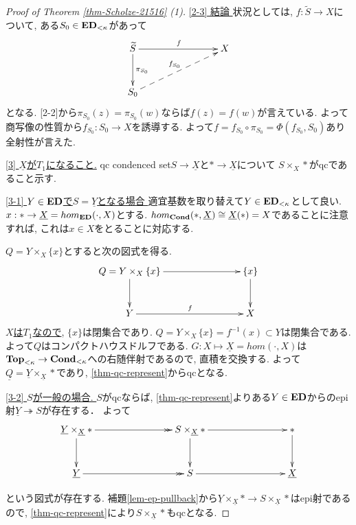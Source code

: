 \documentclass[dvipdfmx,a4paper,11pt]{report}
\theoremstyle{definition}
\begin{document}
\begin{proof}[Proof of Theorem \ref{thm-Scholze-21516} (1)]
\underline{[2-3] 結論 }
状況としては, $f : \widetilde{S} \to X$について, ある$S_0 \in {\bf ED}_{< \kappa}$があって
\begin{equation*}
\xymatrix@C=80pt@R=30pt{
\widetilde{S} \ar@{->}[r]^{f}
\ar@{->}[d]^{\pi_{S_0}}
&X 
\\
S_0\ar@{-->}[ru]^{f_{S_0}}
&
 \\   
}
\end{equation*}
となる. [2-2]から$\pi_{S_0}(z) = \pi_{S_0}(w)$ならば$f(z)=f(w)$が言えている. 
よって商写像の性質から$f_{S_0} : S_0 \to X$を誘導する. 
よって$f = f_{S_0} \circ \pi_{S_0} = \Phi(f_{S_0}, S_0)$あり全射性が言えた. 

\underline{[3] $\underline{X}$が$T_1$になること.}
qc condenced set$S \to \underline{X}$と$\ast \to \underline{X}$について
$S\times_{X} \ast$がqcであること示す. 

\underline{[3-1] $Y \in {\bf ED}$で$S =\underline{Y}$となる場合 }
適宜基数を取り替えて$Y \in {\bf ED}_{<\kappa}$として良い. 
$x : \ast \to \underline{X}=hom_{{\bf ED}}(\cdot, X)$とする.  
$hom_{{\bf Cond}}(\ast, \underline{X}) \cong \underline{X}(\ast) =X$であることに注意すれば, これは$x \in X$をとることに対応する. 

$Q= Y \times_{X} \{ x\}$とすると次の図式を得る. 
\begin{equation*}
\xymatrix@C=80pt@R=30pt{
Q= Y \times_{X} \{ x\} \ar@{->}[r]
\ar@{->}[d]
& \{ x\}\ar@{->}[d]
\\
Y\ar@{->}[r]^{f}
&X
 \\   
}
\end{equation*}
\underline{$X$は$T_1$なので}, $\{ x\}$は閉集合であり. 
$Q = Y \times_{X} \{ x\}=f^{-1}(x) \subset Y$は閉集合である.
よって$Q$はコンパクトハウスドルフである. 
$G : X \mapsto \underline{X} = hom(\cdot, X)$は${\bf Top}_{< \kappa} \to {\bf Cond}_{< \kappa}$への右随伴射であるので, 直積を交換する.
よって
$\underline{Q} = \underline{Y} \times_{\underline{X}} \ast$であり, \ref{thm-qc-represent}からqcとなる. 

\underline{[3-2] $S$が一般の場合. }
$S$がqcならば, \ref{thm-qc-represent}よりある$Y \in {\bf ED}$からのepi射$\underline{Y} \twoheadrightarrow S$が存在する．
よって
\begin{equation*}
\xymatrix@C=80pt@R=30pt{
\underline{Y} \times_{\underline{X}} \ast
\ar@{->}[d]\ar@{->>}[r]
&S\times_{\underline{X}} \ast \ar@{->}[d]\ar@{->}[r]
&\ast \ar@{->}[d]
\\
\underline{Y}\ar@{->>}[r]
&S\ar@{->}[r]
&\underline{X}
 \\   
}
\end{equation*}

という図式が存在する. 
補題\ref{lem-ep-pullback}から$\underline{Y} \times_{\underline{X}}\ast \to S\times_{\underline{X}} \ast $はepi射であるので, \ref{thm-qc-represent}により$S\times_{\underline{X}} \ast $もqcとなる.
\end{proof}
\end{document}
